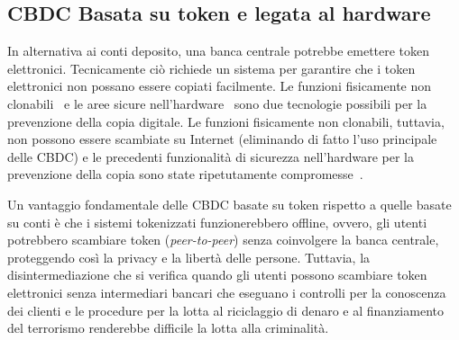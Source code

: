 \documentclass[a4paper]{article}
\begin{document}


\subsection{CBDC Basata su token e legata al hardware}
\label{cbdc-basata-su-token-e-legata-al-hardware}


In alternativa ai conti deposito, una banca centrale potrebbe emettere
token elettronici. Tecnicamente ciò richiede un sistema per garantire che
i token elettronici non possano essere copiati facilmente. Le funzioni
fisicamente non clonabili~\cite[vedi][]{Katzenbeisser} e le aree
sicure nell'hardware~\cite[vedi][]{Alves,Pinto} sono due tecnologie
possibili per la prevenzione della copia digitale. Le funzioni
fisicamente non clonabili, tuttavia, non possono essere scambiate su
Internet (eliminando di fatto l'uso principale delle CBDC) e le precedenti
funzionalità di sicurezza nell'hardware per la prevenzione della copia
sono state ripetutamente
compromesse~\cite[si veda, ad esempio,][]{Wojtczuk,Johnston,Lapid}.

Un vantaggio fondamentale delle CBDC basate su token rispetto a quelle
basate su conti è che i sistemi tokenizzati funzionerebbero offline,
ovvero, gli utenti potrebbero scambiare token (\textit{peer-to-peer})
senza coinvolgere la banca centrale, proteggendo così la privacy e la
libertà delle persone. Tuttavia, la disintermediazione che si verifica
quando gli utenti possono scambiare token elettronici senza
intermediari bancari che eseguano i controlli per la conoscenza dei
clienti e le procedure per la lotta al riciclaggio di denaro e al
finanziamento del terrorismo renderebbe difficile la lotta alla
criminalità.

\end{document}
